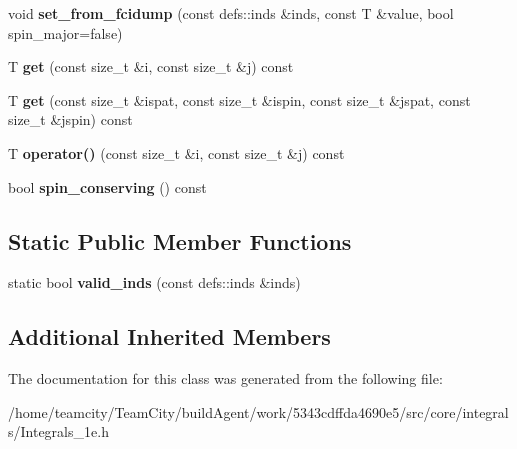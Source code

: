 \begin{DoxyCompactItemize}
\item 
void {\bfseries set\+\_\+from\+\_\+fcidump} (const defs\+::inds \&inds, const T \&value, bool spin\+\_\+major=false)\hypertarget{classIntegrals__1e_ab5212a1e23d46f82ef84f0cd26d19fae}{}\label{classIntegrals__1e_ab5212a1e23d46f82ef84f0cd26d19fae}

\item 
T {\bfseries get} (const size\+\_\+t \&i, const size\+\_\+t \&j) const \hypertarget{classIntegrals__1e_afb3d94c34ac184d18d378e32068be234}{}\label{classIntegrals__1e_afb3d94c34ac184d18d378e32068be234}

\item 
T {\bfseries get} (const size\+\_\+t \&ispat, const size\+\_\+t \&ispin, const size\+\_\+t \&jspat, const size\+\_\+t \&jspin) const \hypertarget{classIntegrals__1e_ace36c264e10938617f6b262fe66586f3}{}\label{classIntegrals__1e_ace36c264e10938617f6b262fe66586f3}

\item 
T {\bfseries operator()} (const size\+\_\+t \&i, const size\+\_\+t \&j) const \hypertarget{classIntegrals__1e_ad7ff7890bc422115b27007babc99725e}{}\label{classIntegrals__1e_ad7ff7890bc422115b27007babc99725e}

\item 
bool {\bfseries spin\+\_\+conserving} () const \hypertarget{classIntegrals__1e_ac21957f0fdae210dd3eba4bad8610c70}{}\label{classIntegrals__1e_ac21957f0fdae210dd3eba4bad8610c70}

\end{DoxyCompactItemize}
\subsection*{Static Public Member Functions}
\begin{DoxyCompactItemize}
\item 
static bool {\bfseries valid\+\_\+inds} (const defs\+::inds \&inds)\hypertarget{classIntegrals__1e_a9c984d09434c3da1aeea59032ca7e802}{}\label{classIntegrals__1e_a9c984d09434c3da1aeea59032ca7e802}

\end{DoxyCompactItemize}
\subsection*{Additional Inherited Members}


The documentation for this class was generated from the following file\+:\begin{DoxyCompactItemize}
\item 
/home/teamcity/\+Team\+City/build\+Agent/work/5343cdffda4690e5/src/core/integrals/Integrals\+\_\+1e.\+h\end{DoxyCompactItemize}
